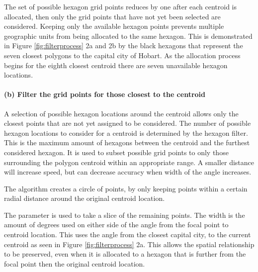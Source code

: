 The set of possible hexagon grid points reduces by one after each
centroid is allocated, then only the grid points that have not yet been
selected are considered. Keeping only the available hexagon points
prevents multiple geographic units from being allocated to the same
hexagon. This is demonstrated in Figure \ref{fig:filterprocess} 2a and
2b by the black hexagons that represent the seven closest polygons to
the capital city of Hobart. As the allocation process begins for the
eighth closest centroid there are seven unavailable hexagon locations.

\hypertarget{b-filter-the-grid-points-for-those-closest-to-the-centroid}{%
\paragraph{(b) Filter the grid points for those closest to the
centroid}\label{b-filter-the-grid-points-for-those-closest-to-the-centroid}}

A selection of possible hexagon locations around the centroid allows
only the closest points that are not yet assigned to be considered. The
number of possible hexagon locations to consider for a centroid is
determined by the hexagon filter. This is the maximum amount of hexagons
between the centroid and the furthest considered hexagon. It is used to
subset possible grid points to only those surrounding the polygon
centroid within an appropriate range. A smaller distance will increase
speed, but can decrease accuracy when width of the angle increases.

The algorithm creates a circle of points, by only keeping points within
a certain radial distance around the original centroid location.

The  parameter is used to take a slice of the remaining
points. The width is the amount of degrees used on either side of the
angle from the focal point to centroid location. This uses the angle
from the closest capital city, to the current centroid as seen in Figure
\ref{fig:filterprocess} 2a. This allows the spatial relationship to be
preserved, even when it is allocated to a hexagon that is further from
the focal point then the original centroid location.

